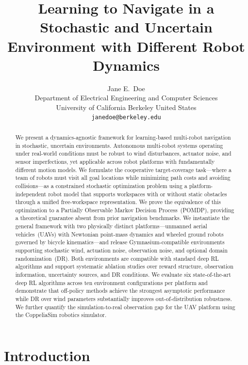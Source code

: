 \documentclass{article}
\title{Learning to Navigate in a Stochastic and Uncertain Environment with Different Robot Dynamics}
\author{
  Jane E.~Doe\\
  Department of Electrical Engineering and Computer Sciences\\
  University of California Berkeley
  United States\\
  \texttt{janedoe@berkeley.edu} \\
}
\begin{document}
\maketitle
\thispagestyle{empty}
\pagestyle{empty}


\begin{abstract}
We present a dynamics-agnostic framework for learning-based multi-robot navigation in stochastic, uncertain environments. Autonomous multi-robot systems operating under real-world conditions must be robust to wind disturbances, actuator noise, and sensor imperfections, yet applicable across robot platforms with fundamentally different motion models. We formulate the cooperative target-coverage task---where a team of robots must visit all goal locations while minimizing path costs and avoiding collisions---as a constrained stochastic optimization problem using a platform-independent robot model that supports workspaces with or without static obstacles through a unified free-workspace representation. We prove the equivalence of this optimization to a Partially Observable Markov Decision Process~(POMDP), providing a theoretical guarantee absent from prior navigation benchmarks. We instantiate the general framework with two physically distinct platforms---unmanned aerial vehicles~(UAVs) with Newtonian point-mass dynamics and wheeled ground robots governed by bicycle kinematics---and release Gymnasium-compatible environments supporting stochastic wind, actuation noise, observation noise, and optional domain randomization~(DR). Both environments are compatible with standard deep RL algorithms and support systematic ablation studies over reward structure, observation information, uncertainty sources, and DR conditions. We evaluate six state-of-the-art deep RL algorithms across ten environment configurations per platform and demonstrate that off-policy methods achieve the strongest asymptotic performance while DR over wind parameters substantially improves out-of-distribution robustness. We further quantify the simulation-to-real observation gap for the UAV platform using the CoppeliaSim robotics simulator.
\end{abstract}


\section{Introduction}
\end{document}
